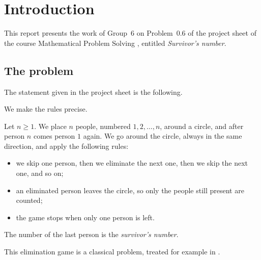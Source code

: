 \section{Introduction}

This report presents the work of Group~6 on Problem~0.6 of the project sheet
of the course Mathematical Problem Solving \cite{projects2026,course2026},
entitled \emph{Survivor's number}.

\subsection{The problem}

The statement given in the project sheet \cite{projects2026} is the
following.

\begin{center}\end{center}

We make the rules precise.

\begin{defi}\label{def:game}
Let $n\geq1$. We place $n$ people, numbered $1,2,\dots,n$, around a circle,
and after person $n$ comes person $1$ again. We go around the circle, always in
the same direction, and apply the following rules:
\begin{itemize}
  \item we skip one person, then we eliminate the next one, then we skip the
        next one, and so on;
  \item an eliminated person leaves the circle, so only the people still
        present are counted;
  \item the game stops when only one person is left.
\end{itemize}
The number of the last person is the \emph{survivor's number}.
\end{defi}

This elimination game is a classical problem, treated for example in
\cite[Chapter~1]{concrete}.

